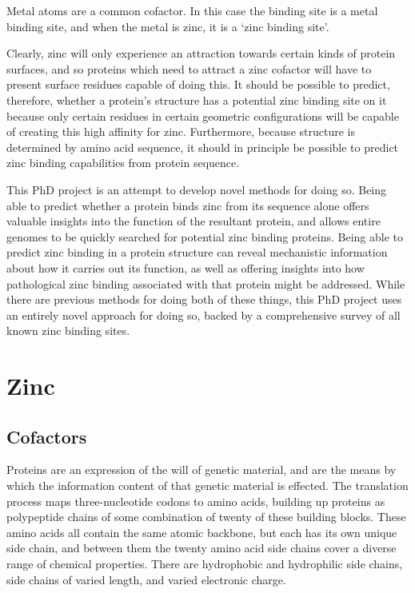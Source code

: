 Metal atoms are a common cofactor. In this case the binding site is a metal binding site, and when the metal is zinc, it is a `zinc binding site'.

Clearly, zinc will only experience an attraction towards certain kinds of protein surfaces, and so proteins which need to attract a zinc cofactor will have to present surface residues capable of doing this. It should be possible to predict, therefore, whether a protein's structure has a potential zinc binding site on it because only certain residues in certain geometric configurations will be capable of creating this high affinity for zinc. Furthermore, because structure is determined by amino acid sequence, it should in principle be possible to predict zinc binding capabilities from protein sequence.

This PhD project is an attempt to develop novel methods for doing so. Being able to predict whether a protein binds zinc from its sequence alone offers valuable insights into the function of the resultant protein, and allows entire genomes to be quickly searched for potential zinc binding proteins. Being able to predict zinc binding in a protein structure can reveal mechanistic information about how it carries out its function, as well as offering insights into how pathological zinc binding associated with that protein might be addressed. While there are previous methods for doing both of these things, this PhD project uses an entirely novel approach for doing so, backed by a comprehensive survey of all known zinc binding sites.

\section{Zinc}

\subsection{Cofactors}

Proteins are an expression of the will of genetic material, and are the means by which the information content of that genetic material is effected. The translation process maps three-nucleotide codons to amino acids, building up proteins as polypeptide chains of some combination of twenty of these building blocks. These amino acids all contain the same atomic backbone, but each has its own unique side chain, and between them the twenty amino acid side chains cover a diverse range of chemical properties. There are hydrophobic and hydrophilic side chains, side chains of varied length, and varied electronic charge.

